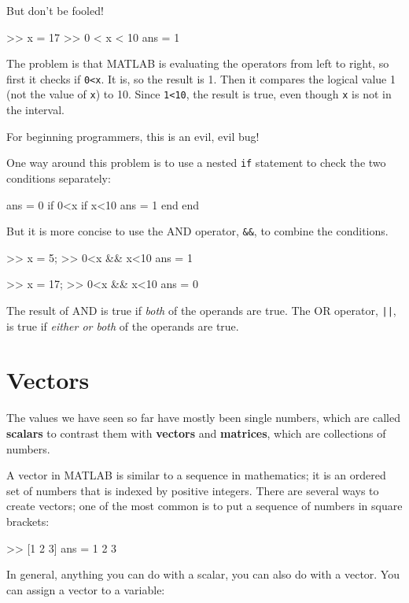 \documentclass[
]{book}
\numberwithin{Answer}{chapter}
\numberwithin{Exercise}{chapter}
\begin{document}
But don't be fooled!

\begin{code}
>> x = 17
>> 0 < x < 10            %
ans = 1
\end{code}

The problem is that MATLAB is evaluating the operators from left
to right, so first it checks if {\tt 0<x}.  It is, so the result
is 1.  Then it compares the logical value 1 (not the value of
{\tt x}) to 10.  Since {\tt 1<10}, the result is true, even though
{\tt x} is not in the interval.

For beginning programmers, this is an evil, evil bug!

One way around this problem is to use a nested {\tt if} statement to
check the two conditions separately:

\begin{code}
ans = 0
if 0<x
    if x<10
        ans = 1
    end
end
\end{code}

But it is more concise to use the AND operator, {\tt \&\&}, to
combine the conditions.

\begin{code}
>> x = 5;
>> 0<x && x<10
ans = 1

>> x = 17;
>> 0<x && x<10
ans = 0
\end{code}

The result of AND is true if {\em both} of the operands are
true.  The OR operator, {\tt ||}, is true if {\em either or both}
of the operands are true.


\section{Vectors}

The values we have seen so far have mostly been single numbers,
which are called {\bf scalars} to contrast them with {\bf vectors}
and {\bf matrices}, which are collections of numbers.

A vector in MATLAB is similar to a sequence in mathematics;
it is an ordered set of numbers that is indexed by positive integers.
There are several ways to create vectors; one of the most common is
to put a sequence of numbers in square brackets:

\begin{code}
>> [1 2 3]
ans = 1     2     3
\end{code}

In general, anything you can do with a scalar, you can also do with
a vector.  You can assign a vector to a variable:
\end{document}
